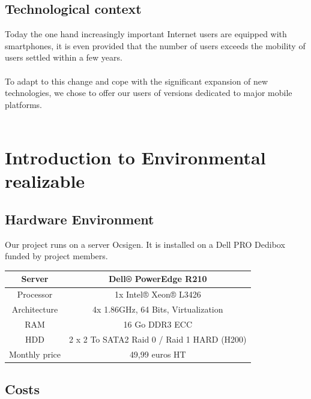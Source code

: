 \documentclass{life-fr}
\begin{document}
\section{Technological context}

Today the one hand increasingly important Internet users are equipped with smartphones, it is even provided that the number of users exceeds the mobility of users settled within a few years.\\
\\
To adapt to this change and cope with the significant expansion of new technologies, we chose to offer our users of versions dedicated to major mobile platforms.\\
\\

\newpage
\hspace{2cm}
\newpage


\chapter{Introduction to Environmental realizable}

\section{Hardware Environment}

Our project runs on a server Ocsigen. It is installed on a Dell PRO Dedibox funded by project members.

\vspace{20pt}

\begin{tabular}{|c|c|}
  \hline
   Server & Dell® PowerEdge R210\\
  \hline
  Processor & 1x Intel® Xeon® L3426\\
  \hline
  Architecture & 4x 1.86GHz, 64 Bits, Virtualization\\
  \hline
  RAM & 16 Go DDR3 ECC\\
  \hline
  HDD & 2 x 2 To SATA2 Raid 0 / Raid 1 HARD (H200)\\
  \hline
  Monthly price & 49,99 euros HT\\
  \hline
\end{tabular}

\vspace{20pt}

\section{Costs}
\end{document}
